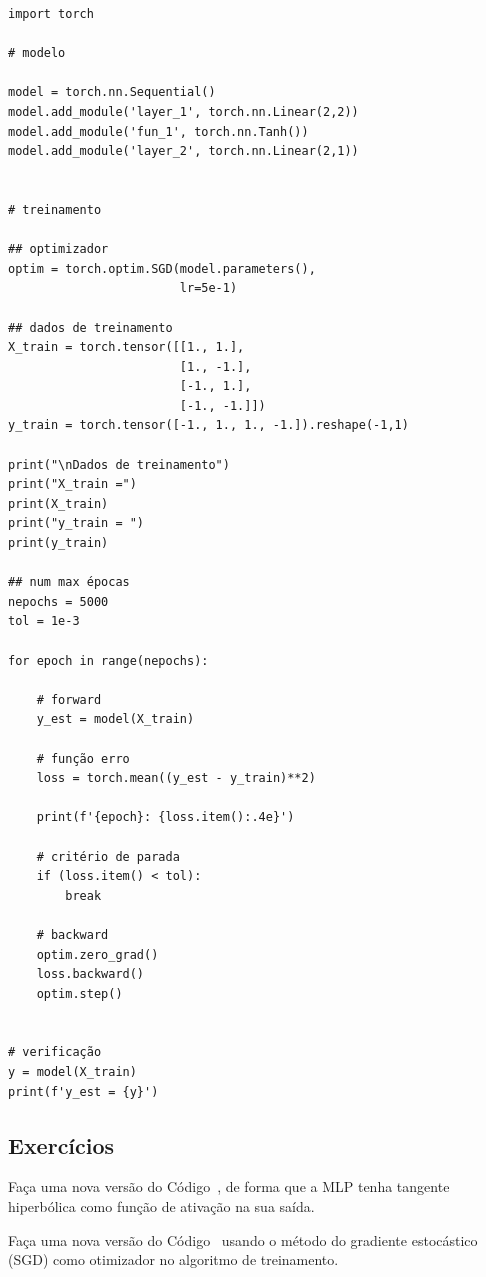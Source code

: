 % 
\begin{lstlisting}[caption=mlp\_xor.py, label=cap_mlp_sec_modelo:cod:mlp_xor]
import torch

# modelo

model = torch.nn.Sequential()
model.add_module('layer_1', torch.nn.Linear(2,2))
model.add_module('fun_1', torch.nn.Tanh())
model.add_module('layer_2', torch.nn.Linear(2,1))


# treinamento

## optimizador
optim = torch.optim.SGD(model.parameters(),
                        lr=5e-1)

## dados de treinamento
X_train = torch.tensor([[1., 1.],
                        [1., -1.],
                        [-1., 1.],
                        [-1., -1.]])
y_train = torch.tensor([-1., 1., 1., -1.]).reshape(-1,1)

print("\nDados de treinamento")
print("X_train =")
print(X_train)
print("y_train = ")
print(y_train)

## num max épocas
nepochs = 5000
tol = 1e-3

for epoch in range(nepochs):

    # forward
    y_est = model(X_train)

    # função erro
    loss = torch.mean((y_est - y_train)**2)

    print(f'{epoch}: {loss.item():.4e}')

    # critério de parada
    if (loss.item() < tol):
        break

    # backward
    optim.zero_grad()
    loss.backward()
    optim.step()


# verificação
y = model(X_train)
print(f'y_est = {y}')
\end{lstlisting}

\subsection{Exercícios}

\begin{exer}
  Faça uma nova versão do Código~\label{cod:cap_mlp_sec_modelo:cod:mlp_xor}, de forma que a MLP tenha tangente hiperbólica como função de ativação na sua saída.
\end{exer}

\begin{exer}
  Faça uma nova versão do Código~\label{cod:cap_mlp_sec_modelo:cod:mlp_xor} usando o método do gradiente estocástico (SGD) como otimizador no algoritmo de treinamento.
\end{exer}

